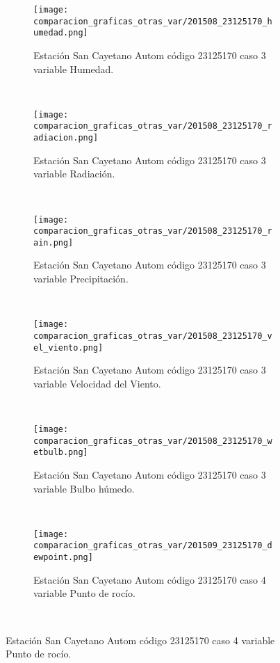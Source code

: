 \begin{figure}[H]
\centering
\begin{subfigure}[normla]{0.4\textwidth}
\caption{Estación San Cayetano Autom  código 23125170 caso 3 variable Humedad.}
\texttt{[image: comparacion\_graficas\_otras\_var/201508\_23125170\_humedad.png]}
\end{subfigure}
~
\begin{subfigure}[normla]{0.4\textwidth}
\caption{Estación San Cayetano Autom  código 23125170 caso 3 variable Radiación.}
\texttt{[image: comparacion\_graficas\_otras\_var/201508\_23125170\_radiacion.png]}
\end{subfigure}
~
\begin{subfigure}[normla]{0.4\textwidth}
\caption{Estación San Cayetano Autom  código 23125170 caso 3 variable Precipitación.}
\texttt{[image: comparacion\_graficas\_otras\_var/201508\_23125170\_rain.png]}
\end{subfigure}
~
\begin{subfigure}[normla]{0.4\textwidth}
\caption{Estación San Cayetano Autom  código 23125170 caso 3 variable Velocidad del Viento.}
\texttt{[image: comparacion\_graficas\_otras\_var/201508\_23125170\_vel\_viento.png]}
\end{subfigure}
~
\begin{subfigure}[normla]{0.4\textwidth}
\caption{Estación San Cayetano Autom  código 23125170 caso 3 variable Bulbo húmedo.}
\texttt{[image: comparacion\_graficas\_otras\_var/201508\_23125170\_wetbulb.png]}
\end{subfigure}
~
\begin{subfigure}[normla]{0.4\textwidth}
\caption{Estación San Cayetano Autom  código 23125170 caso 4 variable Punto de rocío.}
\texttt{[image: comparacion\_graficas\_otras\_var/201509\_23125170\_dewpoint.png]}
\end{subfigure}
~
\end{figure}
           
